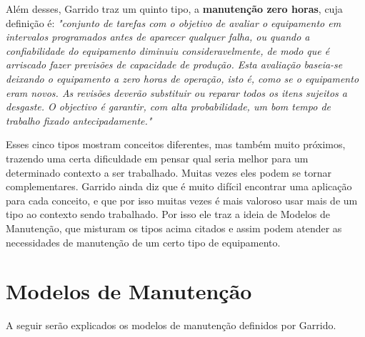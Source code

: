 Além desses, Garrido \cite{garrido} traz um quinto tipo, a   \textbf{manutenção zero horas}, cuja definição é: \emph{"conjunto de tarefas com o objetivo de avaliar o equipamento em intervalos programados antes de aparecer qualquer falha, ou quando a confiabilidade do equipamento diminuiu consideravelmente, de modo que é arriscado fazer previsões de capacidade de produção. Esta avaliação baseia-se deixando o equipamento a zero horas de operação, isto é, como se o equipamento eram novos. As revisões deverão substituir ou reparar todos os itens sujeitos a desgaste. O objectivo é garantir, com alta probabilidade, um bom tempo de trabalho fixado antecipadamente."}

Esses cinco tipos mostram conceitos diferentes, mas também muito próximos, trazendo uma certa dificuldade em pensar qual seria melhor para um determinado contexto a ser trabalhado. Muitas vezes eles podem se tornar complementares. Garrido ainda diz que é muito difícil encontrar uma aplicação para cada conceito, e que por isso muitas vezes é mais valoroso usar mais de um tipo ao contexto sendo trabalhado. Por isso ele traz a ideia de Modelos de Manutenção, que misturam os tipos acima citados e assim podem atender as necessidades de manutenção de um certo tipo de equipamento.

\section{Modelos de Manutenção}

A seguir serão explicados os modelos de manutenção definidos por Garrido.

